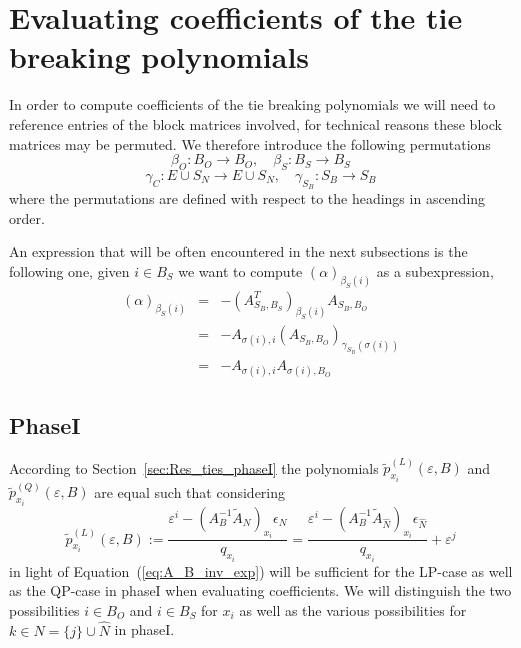 \documentclass[a4paper]{article}
\begin{document}
\section{Evaluating coefficients of the tie breaking polynomials}
In order to compute coefficients of the tie breaking polynomials we will need to
reference entries of the block matrices involved, for technical reasons these
block matrices may be permuted. We therefore introduce the following
permutations
\begin{equation}
\beta_{O}: B_{O}  \rightarrow  B_{O}, \quad
\beta_{S}: B_{S} \rightarrow  B_{S}
\end{equation}
\begin{equation}
\gamma_{C}: E \cup S_{N} \rightarrow  E \cup S_{N}, \quad
\gamma_{S_{B}}: S_{B} \rightarrow  S_{B} 
\end{equation}
where the permutations are defined with respect to the headings in ascending
order.

An expression that will be often encountered in the next subsections is the
following one, given $i \in B_{S}$ we want to compute
$(\alpha)_{\beta_{S}(i)}$ as a subexpression,
\begin{eqnarray}
\left(\alpha\right)_{\beta_{S}(i)}
&=&
-\left(A_{S_{B}, B_{S}}^{T}\right)_{\beta_{S}(i)}A_{S_{B}, B_{O}}
\nonumber \\
&=&
-A_{\sigma(i), i}\left(A_{S_{B}, B_{O}}\right)_{\gamma_{S_{B}}(\sigma(i))}
\nonumber \\
&=&
\label{eq:alpha_beta_S}
-A_{\sigma(i), i}A_{\sigma(i), B_{O}}
\end{eqnarray}

\subsection{PhaseI}
According to Section~\ref{sec:Res_ties_phaseI} the polynomials
$\tilde{p}_{x_{i}}^{(L)}(\varepsilon, B)$ and
$\tilde{p}_{x_{i}}^{(Q)}(\varepsilon, B)$ are equal such that considering
\begin{equation}
\label{eq:p_x_i_tilde_ref}
\tilde{p}_{x_{i}}^{(L)}\left(\varepsilon, B\right) := 
  \frac{\varepsilon^{i}
  - \left(A_{B}^{-1}\tilde{A}_{N}\right)_{x_{i}}
  \epsilon_{N}}{q_{x_{i}}}
= 
\frac{\varepsilon^{i}
- \left(A_{B}^{-1}\tilde{A}_{\hat{N}}\right)_{x_{i}}
  \epsilon_{\hat{N}}}{q_{x_{i}}}
+ \varepsilon^{j}
\end{equation}
in light of Equation~(\ref{eq:A_B_inv_exp})
will be sufficient for the LP-case as well as the QP-case
in phaseI when evaluating coefficients. We will distinguish the two
possibilities $i \in B_{O}$ and $i \in B_{S}$ for $x_{i}$ as well as the
various possibilities for $k \in N=\{j\} \cup \hat{N}$ in phaseI. 
\end{document}
